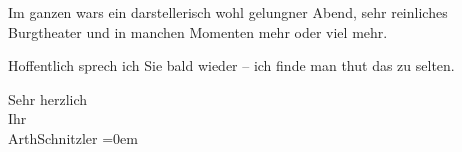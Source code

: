 \pstart
           Im ganzen wars ein darstellerisch wohl gelungner Abend, sehr reinliches Burgtheater und in manchen Momenten mehr oder viel
               mehr.\pend
           
\pstart
           Hoffentlich sprech ich Sie bald wieder – ich finde {\pb}man
               thut das zu selten.\pend
           
\pstart
           Sehr herzlich{\\[\baselineskip]}Ihr{\\[\baselineskip]}\spacefill\mbox{ArthSchnitzler}\pend
           \leftskip=0em{}\endnumbering{}  \newcommand{\dateiname}{L03793}\newcommand{\titel}{Arthur Schnitzler an Stefan Zweig, 28. 4. 1930}\newcommand{\editorInnen}{Selma Jahnke und Martin Anton Müller}
